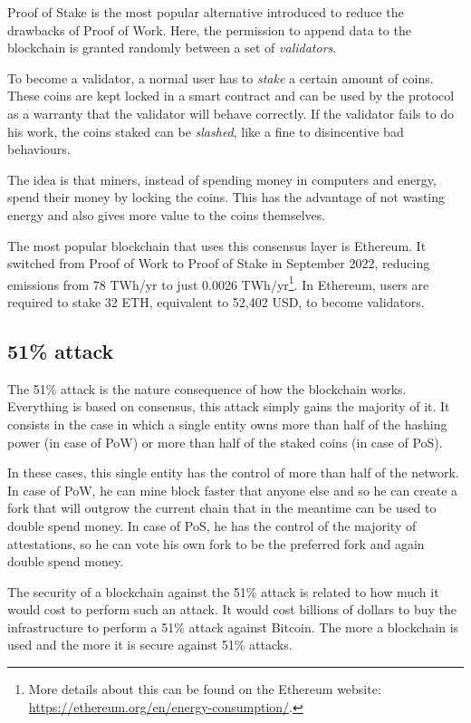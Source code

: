 Proof of Stake is the most popular alternative introduced to reduce the drawbacks of Proof of Work. Here, the permission to append data to the blockchain is granted randomly between a set of \textit{validators}. 

To become a validator, a normal user has to \textit{stake} a certain amount of coins. These coins are kept locked in a smart contract and can be used by the protocol as a warranty that the validator will behave correctly. If the validator fails to do his work, the coins staked can be \textit{slashed}, like a fine to disincentive bad behaviours.

The idea is that miners, instead of spending money in computers and energy, spend their money by locking the coins. This has the advantage of not wasting energy and also gives more value to the coins themselves.

The most popular blockchain that uses this consensus layer is Ethereum. It switched from Proof of Work to Proof of Stake in September 2022, reducing emissions from 78 TWh/yr to just 0.0026 TWh/yr\footnote{More details about this can be found on the Ethereum website: \url{https://ethereum.org/en/energy-consumption/}.}. In Ethereum, users are required to stake 32 ETH, equivalent to 52,402 USD, to become validators.

\subsection{51\% attack}

The 51\% attack is the nature consequence of how the blockchain works. Everything is based on consensus, this attack simply gains the majority of it. It consists in the case in which a single entity owns more than half of the hashing power (in case of PoW) or more than half of the staked coins (in case of PoS). 

In these cases, this single entity has the control of more than half of the network. In case of PoW, he can mine block faster that anyone else and so he can create a fork that will outgrow the current chain that in the meantime can be used to double spend money. In case of PoS, he has the control of the majority of attestations, so he can vote his own fork to be the preferred fork and again double spend money.

The security of a blockchain against the 51\% attack is related to how much it would cost to perform such an attack. It would cost billions of dollars to buy the infrastructure to perform a 51\% attack against Bitcoin. The more a blockchain is used and the more it is secure against 51\% attacks. 

